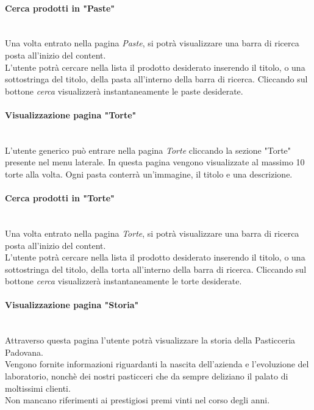\paragraph{Cerca prodotti in "Paste"}\mbox{}\\
\label{par:CerPaste}
Una volta entrato nella pagina \emph{Paste}, si potrà visualizzare una barra di ricerca posta all'inizio del content.\\
L'utente potrà cercare nella lista il prodotto desiderato inserendo il titolo, o una sottostringa del titolo, della pasta all'interno della barra di ricerca. Cliccando sul bottone \emph{cerca} visualizzerà instantaneamente le paste desiderate.

\paragraph{Visualizzazione pagina "Torte"}\mbox{}\\
\label{par:VisTorte}
L'utente generico può entrare nella pagina \emph{Torte} cliccando la sezione "Torte" presente nel menu laterale.
In questa pagina vengono visualizzate al massimo 10 torte alla volta. Ogni pasta conterrà un'immagine, il titolo e una descrizione.\\

\paragraph{Cerca prodotti in "Torte"}\mbox{}\\
\label{par:CerTorte}
Una volta entrato nella pagina \emph{Torte}, si potrà visualizzare una barra di ricerca posta all'inizio del content.\\
L'utente potrà cercare nella lista il prodotto desiderato inserendo il titolo, o una sottostringa del titolo, della torta all'interno della barra di ricerca. Cliccando sul bottone \emph{cerca} visualizzerà instantaneamente le torte desiderate.

\paragraph{Visualizzazione pagina "Storia"}\mbox{}\\
\label{par:VisStoria}
Attraverso questa pagina l'utente potrà visualizzare la storia della Pasticceria Padovana.\\
Vengono fornite informazioni riguardanti la nascita dell'azienda e l'evoluzione del laboratorio,
nonchè dei nostri pasticceri che da sempre deliziano il palato di moltissimi clienti.\\
Non mancano riferimenti ai prestigiosi premi vinti nel corso degli anni.

